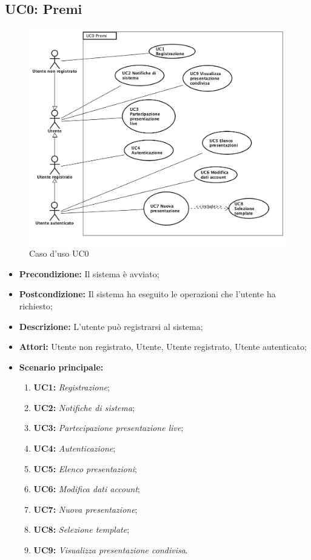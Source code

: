 \subsection{ UC0: Premi}
\begin{figure}[h]
	\begin{center}
	\includegraphics[scale=0.4]{diagram/UC0.png}
	\caption{Caso d'uso UC0}
	\end{center}
\end{figure}
\begin{itemize}
	\item \textbf{Precondizione:} Il sistema è avviato;
	\item \textbf{Postcondizione:} Il sistema ha eseguito le operazioni che l'utente ha richiesto;
	\item \textbf{Descrizione:} L'utente può registrarsi al sistema;
	\item \textbf{Attori:} Utente non registrato, Utente, Utente registrato, Utente autenticato;
	\item \textbf{Scenario principale:}
	\begin{enumerate}
		\item \textbf{ UC1:} \textit{ Registrazione};
		\item \textbf{ UC2:} \textit{ Notifiche di sistema};
		\item \textbf{ UC3:} \textit{ Partecipazione presentazione live};
		\item \textbf{ UC4:} \textit{ Autenticazione};
		\item \textbf{ UC5:} \textit{ Elenco presentazioni};
		\item \textbf{ UC6:} \textit{ Modifica dati account};
		\item \textbf{ UC7:} \textit{ Nuova presentazione};
		\item \textbf{ UC8:} \textit{ Selezione template};
		\item \textbf{ UC9:} \textit{ Visualizza presentazione condivisa}.
	\end{enumerate}
\end{itemize}
\newpage
